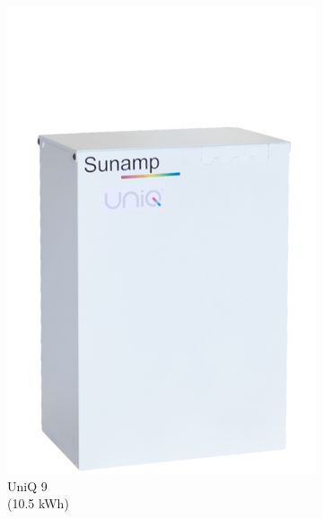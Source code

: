 \begin{figure}[htbp]
\begin{subfigure}{.24\textwidth}
		\includegraphics[width=\textwidth]{figures/sunamp-uniq-9.png}
		\caption{UniQ 9\\
			(10.5 kWh)}
		\label{fig:uniq9}
	\end{subfigure}
	\begin{subfigure}{.24\textwidth}
		\centering

\end{subfigure}
\end{figure}
